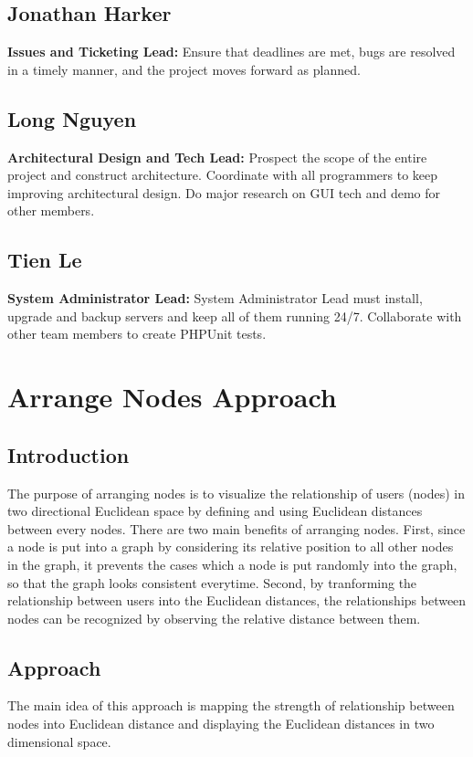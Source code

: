 \documentclass[12pt, letterpaper]{article}
\begin{document}
  \subsection{Jonathan Harker}
  {\bf Issues and Ticketing Lead:} Ensure that deadlines are met, bugs are resolved in a timely manner, and the project moves forward as planned.
  \subsection{Long Nguyen}
  {\bf Architectural Design and Tech Lead:} Prospect the scope of the entire project and construct architecture. Coordinate with all programmers to keep improving architectural design. Do major research on GUI tech and demo for other members.
  \subsection{Tien Le}
  {\bf System Administrator Lead:} System Administrator Lead must install, upgrade and backup servers and keep all of them running 24/7. Collaborate with other team members to create PHPUnit tests.

\section{Arrange Nodes Approach}
 \subsection{Introduction}
  The purpose of arranging nodes is to visualize the relationship of
  users (nodes) in two directional Euclidean space by defining and using Euclidean distances between
  every nodes. There are two main benefits of arranging nodes. First,
  since a node is put into a graph by considering its relative
  position to all other nodes in the graph, it prevents the cases
  which a node is put randomly into the graph, so that the graph looks
  consistent everytime. Second, by tranforming the relationship between
  users into the Euclidean distances, the relationships between nodes
  can be recognized by observing the relative distance between them. 
 \subsection{Approach}
 The main idea of this approach is mapping the strength of
 relationship between nodes into Euclidean distance and displaying the
 Euclidean distances in two dimensional space. 
\end{document}
